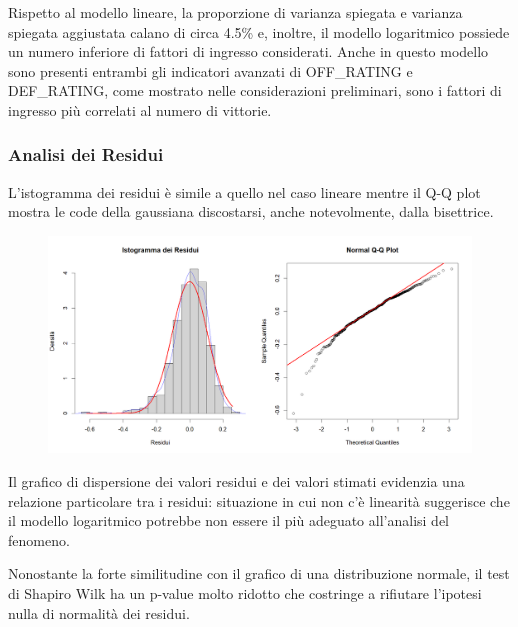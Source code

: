 \documentclass[11pt,a4paper]{article}
\begin{document}
Rispetto al modello lineare, la proporzione di varianza spiegata e varianza spiegata aggiustata calano di circa 4.5\% e, inoltre, il modello logaritmico possiede un numero inferiore di fattori di ingresso considerati. Anche in questo modello sono presenti entrambi gli indicatori avanzati di OFF\_RATING e DEF\_RATING, come mostrato nelle considerazioni preliminari, sono i fattori di ingresso più correlati al numero di vittorie.

\subsubsection{Analisi dei Residui}
 L'istogramma dei residui è simile a quello nel caso lineare mentre il Q-Q plot mostra le code della gaussiana discostarsi, anche notevolmente, dalla bisettrice.

\begin{figure}[h]
    \hspace{-1.5cm}
	\includegraphics[scale=0.6]{imgs/residuals_analysis_log_model.png}
    \end{figure}
\vspace{-0.4cm}

Il grafico di dispersione dei valori residui e dei valori stimati evidenzia una relazione particolare tra i residui: situazione in cui non c’è linearità suggerisce che il modello logaritmico potrebbe non essere il più adeguato all'analisi del fenomeno.

Nonostante la forte similitudine con il grafico di una distribuzione normale, il test di Shapiro Wilk ha un p-value molto ridotto che costringe a rifiutare l'ipotesi nulla di normalità dei residui.
\end{document}
